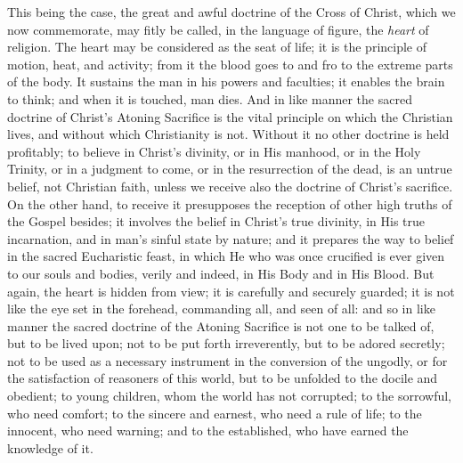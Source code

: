 This being the case, the great and awful doctrine of
the Cross of Christ, which we now commemorate, may fitly
be called, in the language of figure, the \emph{heart} of
religion. The heart may be considered as the seat of
life; it is the principle of motion, heat, and activity;
from it the blood goes to and fro to the extreme parts of
the body. It sustains the man in his powers and
faculties; it enables the brain to think; and when it is
touched, man dies. And in like manner the sacred doctrine
of Christ's Atoning Sacrifice is the vital principle on
which the Christian lives, and without which Christianity
is not. Without it no other doctrine is held profitably;
to believe in Christ's divinity, or in His manhood, or in
the Holy Trinity, or in a judgment to come, or in the
resurrection of the dead, is an untrue belief, not
Christian faith, unless we receive also the doctrine of
Christ's sacrifice. On the other hand, to receive it
presupposes the reception of other high truths of the
Gospel besides; it involves the belief in Christ's true
divinity, in His true incarnation, and in man's sinful
state by nature; and it prepares the way to belief in the
sacred Eucharistic feast, in which He who was once
crucified is ever given to our souls and bodies, verily
and indeed, in His Body and in His Blood. But again, the
heart is hidden from view; it is carefully and securely
guarded; it is not like the eye set in the forehead,
commanding all, and seen of all: and so in like manner
the sacred doctrine of the Atoning Sacrifice is not one
to be talked of, but to be lived upon; not to be put
forth irreverently, but to be adored secretly; not to be
used as a necessary instrument in the conversion of the
ungodly, or for the satisfaction of reasoners of this
world, but to be unfolded to the docile and obedient; to
young children, whom the world has not corrupted; to the
sorrowful, who need comfort; to the sincere and earnest,
who need a rule of life; to the innocent, who need
warning; and to the established, who have earned the
knowledge of it.

